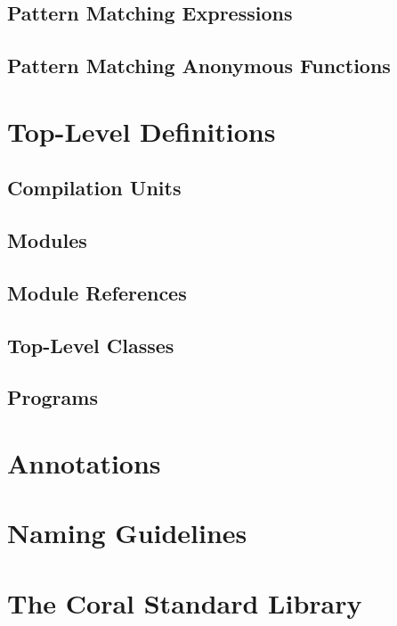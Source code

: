 \section{Pattern Matching Expressions}

\section{Pattern Matching Anonymous Functions}

\chapter{Top-Level Definitions}

\section{Compilation Units}
\label{sec:compilation-units}

\section{Modules}
\label{sec:modules}

\section{Module References}

\section{Top-Level Classes}

\section{Programs}

\chapter{Annotations}
\label{sec:annotations}

\chapter{Naming Guidelines}

\chapter{The Coral Standard Library}

